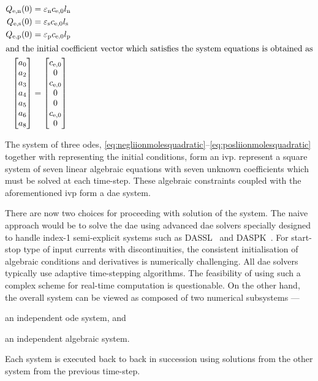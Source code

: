 \begin{align}
    Q_\text{e,n}(0) & = \varepsilon_\text{n} c_\text{e,0} l_\text{n} \label{eq:Qeninit}\\
    Q_\text{e,s}(0) & = \varepsilon_\text{s} c_\text{e,0} l_\text{s}\\
    Q_\text{e,p}(0) & = \varepsilon_\text{p} c_\text{e,0} l_\text{p} \label{eq:Qepinit}\\
    \shortintertext{and the initial coefficient vector which satisfies the system
    equations is obtained as}
    \begin{bmatrix}
        a_0 \\
        a_2 \\
        a_3 \\
        a_4 \\
        a_5 \\
        a_6 \\
        a_8
        \end{bmatrix} & = \begin{bmatrix}
        c_\text{e,0} \\
        0 \\
        c_\text{e,0} \\
        0 \\
        0 \\
        c_\text{e,0} \\
        0
    \end{bmatrix} \label{eq:coeffinit}
\end{align}

The             system             of             three             \glspl{ode},
\eqref{eq:negliionmolesquadratic}--\eqref{eq:posliionmolesquadratic}    together
with    representing the  initial  conditions,
form   an    \gls{ivp}.   
represent a square system of seven linear algebraic equations with seven unknown
coefficients which must be solved at each time-step. These algebraic constraints
coupled with the aforementioned \gls{ivp} form a \gls{dae} system.

There are now two choices for proceeding  with solution of the system. The naive
approach  would be  to  solve  the \gls{dae}  using  advanced \gls{dae}  solvers
specially designed to handle \mbox{index-1}  semi-explicit systems such as
DASSL~\cite{Petzolddassl}
and  DASPK~\cite{VanKeken1995}. For  start-stop  type  of input  currents  with discontinuities,  the
consistent initialisation of algebraic conditions and derivatives is numerically
challenging.  All   \gls{dae}  solvers  typically  use   adaptive  time-stepping
algorithms.  The  feasibility of  using  such  a  complex scheme  for  real-time
computation is questionable. On the other hand, the overall system can be viewed
as composed of two numerical subsystems ---
\begin{enumerate*}[label=\emph{\alph*})]
    \item an independent \gls{ode} system, and
    \item an independent algebraic system.
\end{enumerate*}
Each system  is executed  back to  back in succession  using solutions  from the
other system from the previous time-step.

